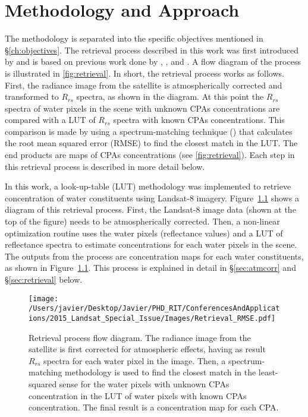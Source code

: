 \chapter{Methodology and Approach}
\label{ch:method}

The methodology is separated into the specific objectives mentioned in \S\ref{ch:objectives}. The retrieval process described in this work was first introduced by \cite*{Concha2013IGARSS} and is based on previous work done by \cite{Raqueno:2000}, \cite{Gerace:2012}, \cite{Pahlevan:2012b} and \cite{Gerace:2013}. A flow diagram of the process is illustrated in \autoref{fig:retrieval}. In short, the retrieval process works as follows. First, the radiance image from the satellite is atmospherically corrected and transformed to $R_{rs}$ spectra, as shown in the diagram. At this point the $R_{rs}$ spectra of water pixels in the scene with unknown CPAs concentrations are compared with a LUT of $R_{rs}$ spectra with known CPAs concentrations. This comparison is made by using a spectrum-matching technique (\cite{Raqueno:2000,Mobley:2005}) that calculates the root mean squared error (RMSE) to find the closest match in the LUT. The end products are maps of CPAs concentrations (see \autoref{fig:retrieval}). Each step in this retrieval process is described in more detail below.

In this work, a look-up-table (LUT) methodology was implemented to retrieve concentration of water constituents using Landsat-8 imagery. Figure~\ref{fig:retrieval} shows a diagram of this retrieval process. First, the Landsat-8 image data (shown at the top of the figure) needs to be atmospherically corrected. Then, a non-linear optimization routine uses the water pixels (reflectance values) and a LUT of reflectance spectra to estimate concentrations for each water pixels in the scene. The outputs from the process are concentration maps for each water constituents, as shown in Figure~\ref{fig:retrieval}. This process is explained in detail in \S\ref{sec:atmcorr} and \S\ref{sec:retrieval} below.

\begin{figure}[htb]
  \centering
    \texttt{[image: /Users/javier/Desktop/Javier/PHD\_RIT/ConferencesAndApplications/2015\_Landsat\_Special\_Issue/Images/Retrieval\_RMSE.pdf]}
    \caption{Retrieval process flow diagram. The radiance image from the satellite is first corrected for atmospheric effects, having as result $R_{rs}$ spectra for each water pixel in the image. Then, a spectrum-matching methodology is used to find the closest match in the least-squared sense for the water pixels with unknown CPAs concentration in the LUT of water pixels with known CPAs concentration. The final result is a concentration map for each CPA.  \label{fig:retrieval} }
\end{figure}

